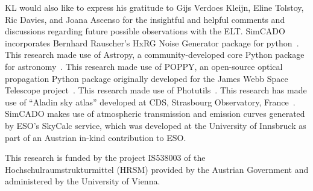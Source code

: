 \documentclass[referee]{aa}
\begin{document}



\begin{acknowledgements}

KL would also like to express his gratitude to Gijs Verdoes Kleijn, Eline Tolstoy, Ric Davies, and Joana Ascenso for the insightful and helpful comments and discussions regarding future possible observations with the ELT\@.
SimCADO incorporates Bernhard Rauscher's HxRG Noise Generator package for python~\citep{nghxrg}.
This research made use of Astropy, a community-developed core Python package for astronomy~\citep{astropy, astropy2}.
This research made use of POPPY, an open-source optical propagation Python package originally developed for the James Webb Space Telescope project~\citep{poppy}.
This research made use of Photutils~\citep{photutils}.
This research has made use of ``Aladin sky atlas'' developed at CDS, Strasbourg Observatory, France~\citep{aladin, aladinlite}.
SimCADO makes use of atmospheric transmission and emission curves generated by ESO's SkyCalc service, which was developed at the University of Innsbruck as part of an Austrian in-kind contribution to ESO\@.

This research is funded by the project IS538003 of the Hochschulraumstrukturmittel (HRSM) provided by the Austrian Government and administered by the University of Vienna.

\end{acknowledgements}







\end{document}
